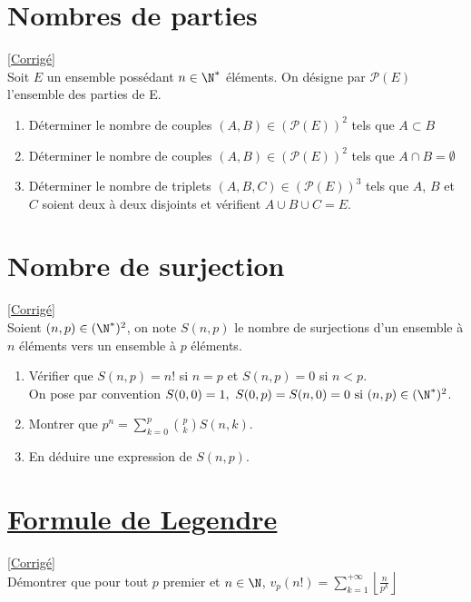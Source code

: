 \documentclass[8pt]{book}
\begin{document}
\section{Nombres de parties }
\label{Nombres de parties}
\textcolor{blue}{\hyperref[Nombres de parties corrigé]{[Corrigé]}}\\
Soit $E$ un ensemble possédant $n\in \N^*$ éléments. On désigne par $\mathcal P(E)$ l'ensemble des parties de E.
\begin{enumerate}
	\item Déterminer le nombre de couples $(A,B)\in(\mathcal P(E))^2$ tels que $A\subset B$
	\item Déterminer le nombre de couples $(A,B)\in(\mathcal P(E))^2$ tels que $A\cap B=\emptyset$
	\item Déterminer le nombre de triplets $(A,B,C)\in(\mathcal P(E))^3$ tels que $A$, $B$ et $C$ soient deux à deux disjoints et vérifient $A\cup B\cup C=E$.
\end{enumerate}

\section{Nombre de surjection }
\label{Nombre de surjection}
\textcolor{blue}{\hyperref[Nombre de surjection corrigé]{[Corrigé]}}\\
Soient $(n,p)\in(\N^*)^2$, on note $S(n,p)$ le nombre de surjections d'un ensemble à $n$ éléments vers un ensemble à $p$ éléments.
\begin{enumerate}[leftmargin=*]
	\item Vérifier que $S(n,p)=n!$ si $n=p$ et $S(n,p)=0$ si $n<p$.
	\\On pose par convention $S(0,0)=1,\ S(0,p)=S(n,0)=0\ \text{si}\ (n,p)\in(\N^*)^2$.
	\item Montrer que $p^n=\displaystyle\sum\limits_{k=0}^p \binom{p}{k}S(n,k)$.
	\item En déduire une expression de $S(n,p)$.
\end{enumerate}

\section{\underline{Formule de Legendre} }
\label{Formule de Legendre}
\label{legendre}
\textcolor{blue}{\hyperref[Formule de Legendre corrigé]{[Corrigé]}}\\
Démontrer que pour tout $p$ premier et $n\in\N$, $v_p(n!)=\displaystyle\sum\limits_{k=1}^{+\infty}\left\lfloor{\frac{n}{p^k}}\right\rfloor$
\end{document}
